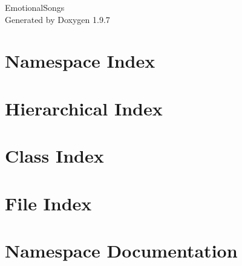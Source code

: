 \documentclass[twoside]{book}
\newcommand{\+}{\discretionary{\mbox{\scriptsize$\hookleftarrow$}}{}{}}
\newcommand{\clearemptydoublepage}{%
    \newpage{\pagestyle{empty}\cleardoublepage}%
  }
\begin{document}
  \raggedbottom
    \hypersetup{pageanchor=false,
                bookmarksnumbered=true,
                pdfencoding=unicode
               }
  \begin{titlepage}
  \vspace*{7cm}
  \begin{center}%
  {\Large Emotional\+Songs}\\
  \vspace*{1cm}
  {\large Generated by Doxygen 1.9.7}\\
  \end{center}
  \end{titlepage}
  \clearemptydoublepage
  \tableofcontents
  \clearemptydoublepage
  \hypersetup{pageanchor=true}
\chapter{Namespace Index}

\chapter{Hierarchical Index}

\chapter{Class Index}

\chapter{File Index}

\chapter{Namespace Documentation}



\end{document}
